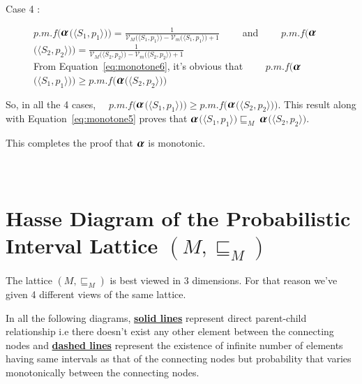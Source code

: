 \documentclass[final,3p, review, times]{Elsevier/elsarticle}
\newcommand{\ALPHA}{\large\boldsymbol{\alpha}\normalsize}
\begin{document}
\begin{description}
  \item[Case 4 :] $p.m.f\Big($$\ALPHA$$\big(\langle S_1,p_1\rangle\big)\Big)=\displaystyle\frac{1}{\mathcal{V}_M\Big(\langle S_1,p_1\rangle\Big)-\mathcal{V}_m\Big(\langle S_1,p_1\rangle\Big)+1}\qquad$ and $\qquad p.m.f\Big($$\ALPHA$$\big(\langle S_2,p_2\rangle\big)\Big)=\displaystyle\frac{1}{\mathcal{V}_M\Big(\langle S_2,p_2\rangle\Big)-\mathcal{V}_m\Big(\langle S_2,p_2\rangle\Big)+1}$ \hfill \\
    From Equation~\ref{eq:monotone6}, it's obvious that $\qquad p.m.f\Big($$\ALPHA$$\big(\langle S_1,p_1\rangle\big)\Big)\geq p.m.f\Big($$\ALPHA$$\big(\langle S_2,p_2\rangle\big)\Big)$
\end{description}

\noindent So, in all the 4 cases, $\quad p.m.f\Big($$\ALPHA$$\big(\langle S_1,p_1\rangle\big)\Big)\geq p.m.f\Big($$\ALPHA$$\big(\langle S_2,p_2\rangle\big)\Big)$. This result along with Equation~\ref{eq:monotone5} proves that $\ALPHA$$\Big(\langle S_1,p_1\rangle\Big)\sqsubseteq_M\ $$\ALPHA$$\Big(\langle S_2,p_2\rangle\Big)$.

\noindent This completes the proof that $\ALPHA$ is monotonic.






\newpage
\section{\\Hasse Diagram of the Probabilistic Interval Lattice $(M,\sqsubseteq_M)$}
\label{app:interval_hasse}

The lattice $(M,\sqsubseteq_M)$ is best viewed in 3 dimensions. For that reason we've given 4 different views of the same lattice.

In all the following diagrams, \underline{\textbf{solid lines}} represent direct parent-child relationship i.e there doesn't exist any other element between the connecting nodes and \underline{\textbf{dashed lines}} represent the existence of infinite number of elements having same intervals as that of the connecting nodes but probability that varies monotonically between the connecting nodes.\\
\end{document}
